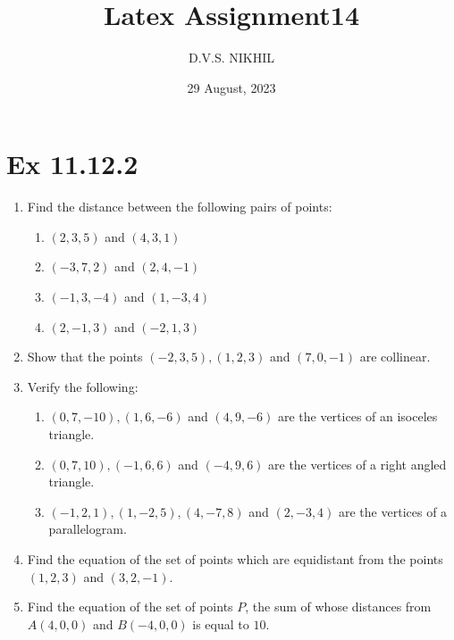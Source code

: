 \documentclass{article}
\theoremstyle{remark}
\begin{document}
\title{Latex Assignment14}
\author{D.V.S. NIKHIL}
\date{29 August, 2023}
\maketitle
\section{Ex 11.12.2}
\begin{enumerate}
\item Find the distance between the following pairs of points:
\begin{enumerate}[label=(\roman*)]
\item $(2,3,5)$ and $(4,3,1)$
\item $(-3,7,2)$ and $(2,4,-1)$
\item $(-1,3,-4)$ and $(1,-3,4)$
\item $(2,-1,3)$ and $(-2,1,3)$
\end{enumerate}
\item Show that the points $(-2,3,5), (1,2,3)$ and $(7,0,-1)$ are collinear.
\item Verify the following:
\begin{enumerate}[label=(\roman*)]
\item $(0,7,-10), (1,6,-6)$ and $(4,9,-6)$ are the vertices of an isoceles triangle.
\item $(0,7,10), (-1,6,6)$ and $(-4,9,6)$ are the vertices of a right angled triangle.
\item $(-1,2,1), (1,-2,5), (4,-7,8)$ and $(2,-3,4)$ are the vertices of a parallelogram.
\end{enumerate}
\item Find the equation of the set of points which are equidistant from the points $(1,2,3)$ and $(3,2,-1)$.
\item Find the equation of the set of points $P$, the sum of whose distances from $A(4,0,0)$ and $B(-4,0,0)$ is equal to $10$.
\end{enumerate}
\end{document}
